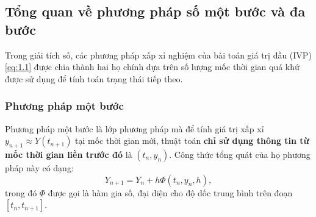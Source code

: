 




\subsection{Tổng quan về phương pháp số một bước và đa bước}

Trong giải tích số, các phương pháp xấp xỉ nghiệm của bài toán giá trị đầu (IVP) \eqref{eq:1.1} được chia thành hai họ chính dựa trên số lượng mốc thời gian quá khứ được sử dụng để tính toán trạng thái tiếp theo.

\subsubsection{Phương pháp một bước}
Phương pháp một bước là lớp phương pháp mà để tính giá trị xấp xỉ $y_{n+1} \approx Y(t_{n+1})$ tại mốc thời gian mới, thuật toán \textbf{chỉ sử dụng thông tin từ mốc thời gian liền trước đó} là $(t_n, y_n)$. Công thức tổng quát của họ phương pháp này có dạng:
\begin{equation}
    Y_{n+1} = Y_n + h \Phi(t_n, y_n, h), \tag{1.6}
\end{equation}
\noindent trong đó $\Phi$ được gọi là hàm gia số, đại diện cho độ dốc trung bình trên đoạn $[t_n, t_{n+1}]$.

